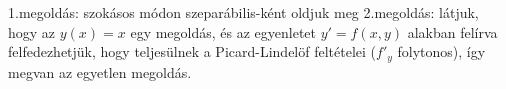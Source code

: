 1.megoldás: szokásos módon szeparábilis-ként oldjuk meg\us
2.megoldás: látjuk, hogy az $y(x)=x$ egy megoldás, 
és az egyenletet $y'=f(x,y)$ alakban felírva felfedezhetjük, 
hogy teljesülnek a Picard-Lindelöf feltételei 
($f'_y$ folytonos), így megvan az egyetlen megoldás.
